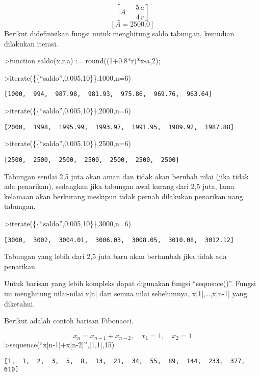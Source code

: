 \documentclass[
]{book}
\begin{document}
\[\left[ A=\frac{5\,a}{4\,r} \right] \]\[\left[ A=2500.0 \right] \]Berikut didefinisikan fungsi untuk menghitung saldo tabungan, kemudian dilakukan iterasi.

\textgreater function saldo(x,r,a) := round((1+0.8*r)*x-a,2);

\textgreater iterate(\{\{``saldo'',0.005,10\}\},1000,n=6)

\begin{verbatim}
[1000,  994,  987.98,  981.93,  975.86,  969.76,  963.64]
\end{verbatim}

\textgreater iterate(\{\{``saldo'',0.005,10\}\},2000,n=6)

\begin{verbatim}
[2000,  1998,  1995.99,  1993.97,  1991.95,  1989.92,  1987.88]
\end{verbatim}

\textgreater iterate(\{\{``saldo'',0.005,10\}\},2500,n=6)

\begin{verbatim}
[2500,  2500,  2500,  2500,  2500,  2500,  2500]
\end{verbatim}

Tabungan senilai 2,5 juta akan aman dan tidak akan berubah nilai (jika tidak ada penarikan), sedangkan jika tabungan awal kurang dari 2,5 juta, lama kelamaan akan berkurang meskipun tidak pernah dilakukan penarikan uang tabungan.

\textgreater iterate(\{\{``saldo'',0.005,10\}\},3000,n=6)

\begin{verbatim}
[3000,  3002,  3004.01,  3006.03,  3008.05,  3010.08,  3012.12]
\end{verbatim}

Tabungan yang lebih dari 2,5 juta baru akan bertambah jika tidak ada penarikan.

Untuk barisan yang lebih kompleks dapat digunakan fungsi ``sequence()''. Fungsi ini menghitung nilai-nilai x{[}n{]} dari semua nilai sebelumnya, x{[}1{]},\ldots,x{[}n-1{]} yang diketahui.

Berikut adalah contoh barisan Fibonacci.

\[x_n = x_{n-1}+x_{n-2}, \quad x_1=1, \quad x_2 =1\]\textgreater sequence(``x{[}n-1{]}+x{[}n-2{]}'',{[}1,1{]},15)

\begin{verbatim}
[1,  1,  2,  3,  5,  8,  13,  21,  34,  55,  89,  144,  233,  377,  610]
\end{verbatim}
\end{document}
